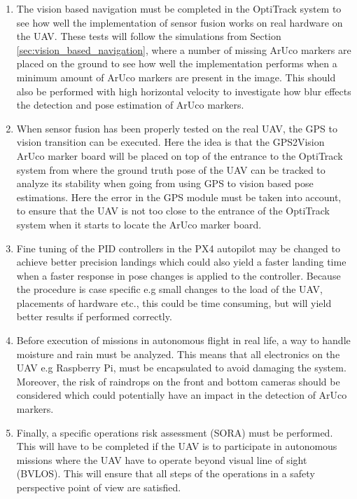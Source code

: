 \documentclass[../Head/report.tex]{subfiles}
\begin{document}
\begin{enumerate}[rightmargin=0.5cm]

    \item The vision based navigation must be completed in the OptiTrack system to see how well the implementation of sensor fusion works on real hardware on the UAV. These tests will follow the simulations from Section \ref{sec:vision_based_navigation}, where a number of missing ArUco markers are placed on the ground to see how well the implementation performs when a minimum amount of ArUco markers are present in the image. This should also be performed with high horizontal velocity to investigate how blur effects the detection and pose estimation of ArUco markers.
    
    \item When sensor fusion has been properly tested on the real UAV, the GPS to vision transition can be executed. Here the idea is that the GPS2Vision ArUco marker board will be placed on top of the entrance to the OptiTrack system from where the ground truth pose of the UAV can be tracked to analyze its stability when going from using GPS to vision based pose estimations. Here the error in the GPS module must be taken into account, to ensure that the UAV is not too close to the entrance of the OptiTrack system when it starts to locate the ArUco marker board. 
    
    \item Fine tuning of the PID controllers in the PX4 autopilot may be changed to achieve better precision landings which could also yield a faster landing time when a faster response in pose changes is applied to the controller. Because the procedure is case specific e.g small changes to the load of the UAV, placements of hardware etc., this could be time consuming, but will yield better results if performed correctly. 
    
    \item Before execution of missions in autonomous flight in real life, a way to handle moisture and rain must be analyzed. This means that all electronics on the UAV e.g Raspberry Pi, must be encapsulated to avoid damaging the system. Moreover, the risk of raindrops on the front and bottom cameras should be considered which could potentially have an impact in the detection of ArUco markers.
    
    \item Finally, a specific operations risk assessment (SORA) must be performed. This will have to be completed if the UAV is to participate in autonomous missions where the UAV have to operate beyond visual line of sight (BVLOS). This will ensure that all steps of the operations in a safety perspective point of view are satisfied.
     
\end{enumerate}
\end{document}
